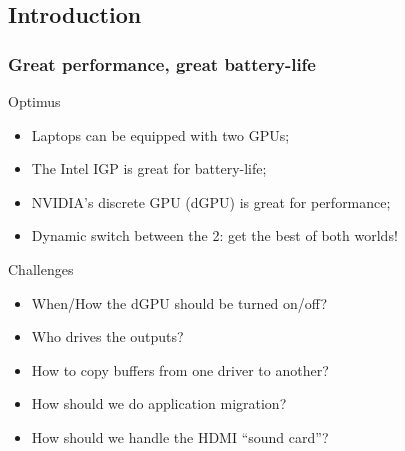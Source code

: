 \documentclass[11pt,english,compress]{beamer}
\begin{document}
\subsection{Introduction}
\begin{frame}
	\frametitle{Great performance, great battery-life}

	\begin{block}{Optimus}
		\begin{itemize}
			\item Laptops can be equipped with two GPUs;
			\item The Intel IGP is great for battery-life;
			\item NVIDIA's discrete GPU (dGPU) is great for performance;
			\item Dynamic switch between the 2: get the best of both worlds!
		\end{itemize}
	\end{block}

	\begin{block}{Challenges}
		\begin{itemize}
			\item When/How the dGPU should be turned on/off?
			\item Who drives the outputs?
			\item How to copy buffers from one driver to another?
			\item How should we do application migration?
			\item How should we handle the HDMI ``sound card''?
		\end{itemize}
	\end{block}
\end{frame}
\end{document}

